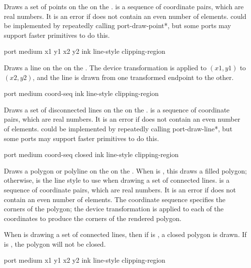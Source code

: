 Draws a set of points on the   on the 
.   is a sequence of coordinate pairs, which are real
numbers.  It is an error if  does not contain an even number of
elements.   could be implemented by repeatedly calling
{port-draw-point*}, but some ports may support faster primitives to do this.

 {port medium x1 y1 x2 y2
                               \optional ink line-style clipping-region}

Draws a line on the   on the  .
The device transformation is applied to $(x1,y1)$ to $(x2,y2)$, and the line is
drawn from one transformed endpoint to the other.

 {port medium coord-seq
                                \optional ink line-style clipping-region}

Draws a set of disconnected lines on the   on the
 .   is a sequence of coordinate pairs,
which are real numbers.  It is an error if  does not contain an
even number of elements.   could be implemented by
repeatedly calling {port-draw-line*}, but some ports may support faster
primitives to do this.

 {port medium coord-seq closed
                                  \optional ink line-style clipping-region} 

Draws a polygon or polyline on the   on the 
.  When  is , this draws a filled polygon;
otherwise,  is the line style to use when drawing a set of
connected lines.   is a sequence of coordinate pairs, which are
real numbers.  It is an error if  does not contain an even number
of elements.  The coordinate sequence specifies the corners of the polygon; the
device transformation is applied to each of the coordinates to produce the
corners of the rendered polygon.

When  is drawing a set of connected lines, then if
 is , a closed polygon is drawn.  If  is
, the polygon will not be closed.

 {port medium x1 y1 x2 y2
                                    \optional ink line-style clipping-region}

